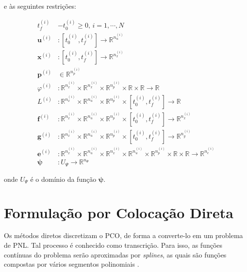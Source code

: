 \noindent e às seguintes restrições:

\begin{equation}
\begin{aligned}
    t_f^{(i)} &- t_0^{(i)} \geq 0, \, i = 1, \cdots, N \\
    \mathbf{u}^{(i)} &: \left[ t_0^{(i)}, t_f^{(i)} \right] \rightarrow \mathbb{R}^{n_u^{(i)}} \\
    \mathbf{x}^{(i)} &: \left[ t_0^{(i)}, t_f^{(i)} \right] \rightarrow \mathbb{R}^{n_x^{(i)}} \\
    \mathbf{p}^{(i)} &\in \mathbb{R}^{n_p^{(i)}} \\
    \varphi^{(i)} &: \mathbb{R}^{n_x^{(i)}} \times \mathbb{R}^{n_x^{(i)}} \times \mathbb{R}^{n_p^{(i)}} \times \mathbb{R} \times \mathbb{R} \rightarrow \mathbb{R} \\
    L^{(i)} &: \mathbb{R}^{n_x^{(i)}} \times \mathbb{R}^{n_u^{(i)}} \times \mathbb{R}^{n_p^{(i)}} \times \left[ t_0^{(i)}, t_f^{(i)} \right] \rightarrow \mathbb{R} \\
    \mathbf{f}^{(i)} &: \mathbb{R}^{n_x^{(i)}} \times \mathbb{R}^{n_u^{(i)}} \times \mathbb{R}^{n_p^{(i)}} \times \left[ t_0^{(i)}, t_f^{(i)} \right] \rightarrow \mathbb{R}^{n_x^{(i)}} \\
    \mathbf{g}^{(i)} &: \mathbb{R}^{n_x^{(i)}} \times \mathbb{R}^{n_u^{(i)}} \times \mathbb{R}^{n_p^{(i)}} \times \left[ t_0^{(i)}, t_f^{(i)} \right] \rightarrow \mathbb{R}^{n_g^{(i)}} \\
    \mathbf{e}^{(i)} &: \mathbb{R}^{n_x^{(i)}} \times \mathbb{R}^{n_u^{(i)}} \times \mathbb{R}^{n_x^{(i)}} \times \mathbb{R}^{n_u^{(i)}} \times \mathbb{R}^{n_p^{(i)}} \times \mathbb{R} \times \mathbb{R} \rightarrow \mathbb{R}^{n_e^{(i)}} \\
    \boldsymbol{\psi} &: U_{\Psi} \rightarrow \mathbb{R}^{n_{\Psi}}
\end{aligned}
\end{equation}

\noindent onde $U_{\Psi}$ é o domínio da função $\boldsymbol{\psi}$.

\section{Formulação por Colocação Direta}
\label{sec:formulação-coloc-direta}

Os métodos diretos discretizam o PCO, de forma a converte-lo em um problema de PNL. Tal processo é conhecido como transcrição. Para isso, as funções contínuas do problema serão aproximadas por \textit{splines}, as quais são funções compostas por vários segmentos polinomiais \cite{kelly_introduction_2017}.

